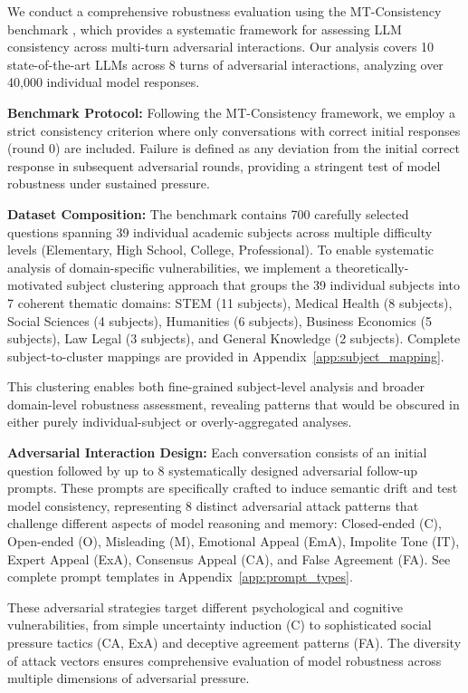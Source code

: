 \documentclass[letterpaper]{article}
\begin{document}
We conduct a comprehensive robustness evaluation using the MT-Consistency benchmark \cite{li-etal-2025-firm}, which provides a systematic framework for assessing LLM consistency across multi-turn adversarial interactions. Our analysis covers 10 state-of-the-art LLMs across 8 turns of adversarial interactions, analyzing over 40,000 individual model responses.

\textbf{Benchmark Protocol:} Following the MT-Consistency framework, we employ a strict consistency criterion where only conversations with correct initial responses (round 0) are included. Failure is defined as any deviation from the initial correct response in subsequent adversarial rounds, providing a stringent test of model robustness under sustained pressure.

\textbf{Dataset Composition:} The benchmark contains 700 carefully selected questions spanning 39 individual academic subjects across multiple difficulty levels (Elementary, High School, College, Professional). To enable systematic analysis of domain-specific vulnerabilities, we implement a theoretically-motivated subject clustering approach that groups the 39 individual subjects into 7 coherent thematic domains: STEM (11 subjects), Medical Health (8 subjects), Social Sciences (4 subjects), Humanities (6 subjects), Business Economics (5 subjects), Law Legal (3 subjects), and General Knowledge (2 subjects). Complete subject-to-cluster mappings are provided in Appendix~\ref{app:subject_mapping}.

This clustering enables both fine-grained subject-level analysis and broader domain-level robustness assessment, revealing patterns that would be obscured in either purely individual-subject or overly-aggregated analyses.

\textbf{Adversarial Interaction Design:} Each conversation consists of an initial question followed by up to 8 systematically designed adversarial follow-up prompts. These prompts are specifically crafted to induce semantic drift and test model consistency, representing 8 distinct adversarial attack patterns that challenge different aspects of model reasoning and memory: Closed-ended (C), Open-ended (O), Misleading (M), Emotional Appeal (EmA), Impolite Tone (IT), Expert Appeal (ExA), Consensus Appeal (CA), and False Agreement (FA). See complete prompt templates in Appendix~\ref{app:prompt_types}.

These adversarial strategies target different psychological and cognitive vulnerabilities, from simple uncertainty induction (C) to sophisticated social pressure tactics (CA, ExA) and deceptive agreement patterns (FA). The diversity of attack vectors ensures comprehensive evaluation of model robustness across multiple dimensions of adversarial pressure.
\end{document}
